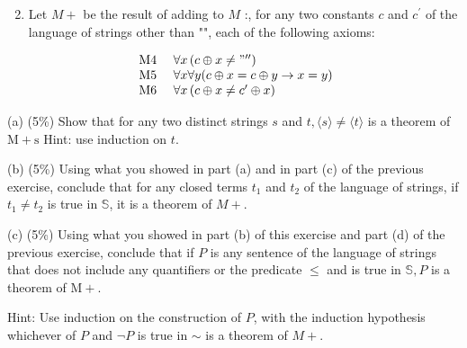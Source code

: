 \documentclass[10pt]{article}
\begin{document}
\begin{enumerate}
  \setcounter{enumi}{1}
  \item Let \(M+\) be the result of adding to \(M\) :, for any two constants \(c\) and \(c^{\prime}\) of the language of strings other than "", each of the following axioms:
\end{enumerate}

\[
\begin{array}{ll}
\text { M4 } & \forall x\left(c \oplus x \neq "^{\prime \prime}\right) \\
\text { M5 } & \forall x \forall y(c \oplus x=c \oplus y \rightarrow x=y) \\
\text { M6 } & \forall x\left(c \oplus x \neq c^{\prime} \oplus x\right)
\end{array}
\]

(a) (5\%) Show that for any two distinct strings \(s\) and \(t,\langle s\rangle \neq\langle t\rangle\) is a theorem of \(\mathrm{M}+\mathrm{s}\) Hint: use induction on \(t\).

(b) (5\%) Using what you showed in part (a) and in part (c) of the previous exercise, conclude that for any closed terms \(t_{1}\) and \(t_{2}\) of the language of strings, if \(t_{1} \neq t_{2}\) is true in \(\mathbb{S}\), it is a theorem of \(M+\).

(c) (5\%) Using what you showed in part (b) of this exercise and part (d) of the previous exercise, conclude that if \(P\) is any sentence of the language of strings that does not include any quantifiers or the predicate \(\leq\) and is true in \(\mathbb{S}, P\) is a theorem of \(\mathrm{M}+\).

Hint: Use induction on the construction of \(P\), with the induction hypothesis whichever of \(P\) and \(\neg P\) is true in \(\sim\) is a theorem of \(M+\).
\end{document}
